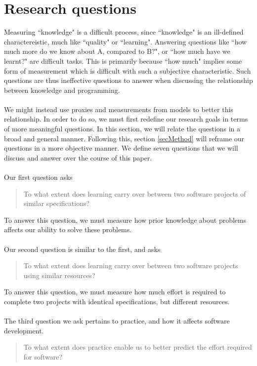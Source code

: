 \section{Research questions} \label{secMotivation}

Measuring ``knowledge" is a difficult process, since ``knowledge" is an
ill-defined charactereistic, much like ``quality" or ``learning".
Answering questions like ``how much more do we know about A, compared to B?", or
``how much have we learnt?" are difficult tasks.
This is primarily because ``how much" implies some form of measurement which is
difficult with such a subjective characteristic.
Such questions are thus ineffective questions to answer when discussing the
relationship between knowledge and programming.\\
\\
We might instead use proxies and measurements from models to better this
relationship.
In order to do so, we must first redefine our research goals in terms of more
meaningful questions.
In this section, we will relate the questions in a broad and general manner.
Following this, section \ref{secMethod} will reframe our questions in a more
objective manner.
We define seven questions that we will discuss and answer over the course of
this paper.\\
\\
Our first question asks
\begin{quote}
  To what extent does learning carry over between two software projects of similar
  specifications?
\end{quote}
To answer this question, we must measure how prior knowledge about problems affects
our ability to solve these problems.\\
\\
Our second question is similar to the first, and asks
\begin{quote}
  To what extent does learning carry over between two software projects using
  similar resources?
\end{quote}
To answer this question, we must measure how much effort is required to complete
two projects with identical specifications, but different resources.\\
\\
The third question we ask pertains to practice, and how it affects software
development.
\begin{quote}
  To what extent does practice enable us to better predict the effort required
  for software?
\end{quote}
